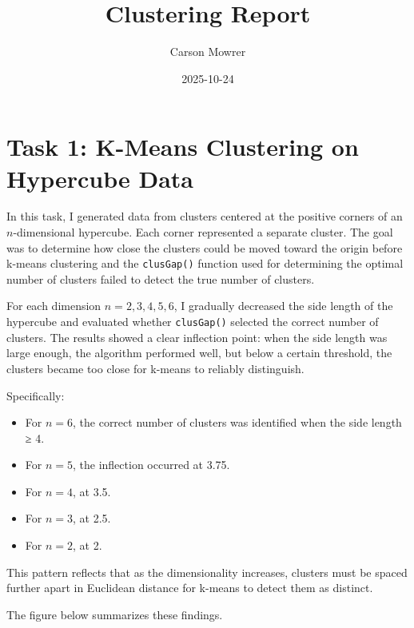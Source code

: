 \documentclass[
]{article}
\title{Clustering Report}
\author{Carson Mowrer}
\date{2025-10-24}
\providecommand{\tightlist}{%
  \setlength{\itemsep}{0pt}\setlength{\parskip}{0pt}}
\begin{document}
\maketitle

\section{Task 1: K-Means Clustering on Hypercube
Data}\label{task-1-k-means-clustering-on-hypercube-data}

In this task, I generated data from clusters centered at the positive
corners of an \(n\)-dimensional hypercube. Each corner represented a
separate cluster. The goal was to determine how close the clusters could
be moved toward the origin before k-means clustering and the
\texttt{clusGap()} function used for determining the optimal number of
clusters failed to detect the true number of clusters.

For each dimension \(n = 2, 3, 4, 5, 6\), I gradually decreased the side
length of the hypercube and evaluated whether \texttt{clusGap()}
selected the correct number of clusters. The results showed a clear
inflection point: when the side length was large enough, the algorithm
performed well, but below a certain threshold, the clusters became too
close for k-means to reliably distinguish.

Specifically:

\begin{itemize}
\tightlist
\item
  For \(n = 6\), the correct number of clusters was identified when the
  side length ≥ 4.
\item
  For \(n = 5\), the inflection occurred at 3.75.
\item
  For \(n = 4\), at 3.5.
\item
  For \(n = 3\), at 2.5.
\item
  For \(n = 2\), at 2.
\end{itemize}

This pattern reflects that as the dimensionality increases, clusters
must be spaced further apart in Euclidean distance for k-means to detect
them as distinct.

The figure below summarizes these findings.
\end{document}
